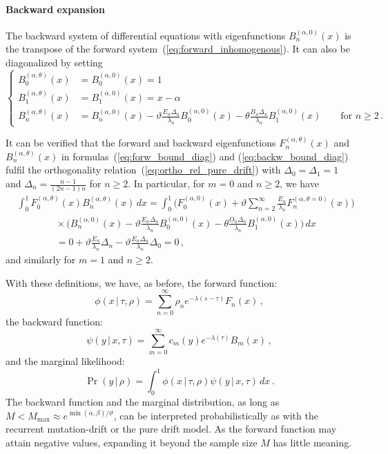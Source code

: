 \documentclass[preprint]{elsarticle}
\newcommand\given{{\,|\,}}
\newcommand\y{\ensuremath{y}}
\begin{document}
\paragraph{Backward expansion} The backward system of differential equations with eigenfunctions $B_n^{(\alpha,0)}(x)$ is the transpose of the forward system~(\ref{eq:forward_inhomogenous}). It can also be diagonalized by setting
\begin{equation}\label{eq:backw_bound_diag}
\begin{cases}
    B_0^{(\alpha,\theta)}(x)&=B_0^{(\alpha,0)}(x)=1\\
    B_1^{(\alpha,\theta)}(x)&=B_1^{(\alpha,0)}(x)=x-\alpha\\
    B_n^{(\alpha,\theta)}(x)&=B_n^{(\alpha,0)}(x)-\vartheta \frac{E_n\Delta_n}{\lambda_n} B_0^{(\alpha,0)}(x)-\theta \frac{B_n\Delta_n}{\lambda_n} B_1^{(\alpha,0)}(x)\qquad\text{for $n\geq 2$}\,.
\end{cases}
\end{equation}

It can be verified that the forward and backward eigenfunctions $F_n^{(\alpha,\theta)}(x)$ and $B_n^{(\alpha,\theta)}(x)$ in formulas~(\ref{eq:forw_bound_diag}) and (\ref{eq:backw_bound_diag}) fulfil the orthogonality relation~(\ref{eq:ortho_rel_pure_drift}) with $\Delta_0=\Delta_1=1$ and $\Delta_n=\frac{n-1}{(2n-1)n}$ for $n\geq 2$. 
In particular, for $m=0$ and $n\geq 2$, we have
\begin{equation}
\begin{split}
    &\int_0^1 F_0^{(\alpha,\theta)}(x)B_n^{(\alpha,\theta)}(x)\,dx=\int_0^1 \bigg(F_0^{(\alpha,0)}(x)+\vartheta \sum_{n=2}^\infty\frac{E_n}{\lambda_n} F_n^{(\alpha,\theta=0)}(x)\bigg)\\
    &\qquad\qquad\times \bigg(B_n^{(\alpha,0)}(x)-\vartheta \frac{E_n\Delta_n}{\lambda_n} B_0^{(\alpha,0)}(x)-\theta \frac{O_n\Delta_n}{\lambda_n} B_1^{(\alpha,0)}(x)\bigg)\,dx\\
    &\qquad\qquad=0+\vartheta \frac{E_n}{\lambda_n} \Delta_n-\vartheta  \frac{E_n\Delta_n}{\lambda_n} \Delta_0=0\,,
\end{split}
\end{equation}
and similarly for $m=1$ and $n\geq 2$. 

With these definitions, we have, as before, the forward function:
\begin{equation}
  \phi(x\given \tau,\rho)=\sum_{n=0}^\infty \rho_n e^{-\lambda(s-\tau)} F_n(x)\,,
\end{equation}
the backward function:
\begin{equation}
\psi(\y\given x,\tau)=\sum_{m=0}^\infty c_m(\y) e^{-\lambda(\tau)} B_m(x)\,,
\end{equation} 
and the marginal likelihood: 
\begin{equation}
  \Pr(\y\given \rho)=\int_0^1 \phi(x\given \tau, \rho)\psi(\y\given x,\tau)\,dx\,.
\end{equation}
The backward function and the marginal distribution, as long as $M<M_{\max}\approx e^{\min(\alpha,\beta)/\vartheta}$, can be interpreted probabilistically as with the recurrent mutation-drift or the pure drift model. As the forward function may attain negative values, expanding it beyond the sample size $M$ has little meaning.  
\end{document}
